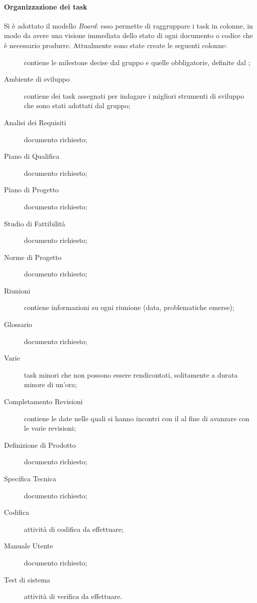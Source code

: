 \paragraph{Organizzazione dei task} Si è adottato il modello \emph{Board}: esso permette di raggruppare i task in colonne, in modo da avere una visione immediata dello stato di ogni documento o codice che è necessario produrre.
Attualmente sono state create le seguenti colonne:
\begin{description}
	\item[] contiene le milestone decise dal gruppo e quelle obbligatorie, definite dal \TV;
	\item[Ambiente di sviluppo] contiene dei task assegnati per indagare i migliori strumenti di sviluppo che sono stati adottati dal gruppo;
	\item[Analisi dei Requisiti] documento richiesto;
	\item[Piano di Qualifica] documento richiesto;
	\item[Piano di Progetto] documento richiesto;
	\item[Studio di Fattibilità] documento richiesto;
	\item[Norme di Progetto] documento richiesto;
	\item[Riunioni] contiene informazioni su ogni riunione (data, problematiche emerse);
	\item[Glossario] documento richiesto;
	\item[Varie] task minori che non possono essere rendicontati, solitamente a durata minore di un'ora;
	\item[Completamento Revisioni] contiene le date nelle quali si hanno incontri con il \TV al fine di avanzare con le varie revisioni; 
	\item[Definizione di Prodotto] documento richiesto;
	\item[Specifica Tecnica] documento richiesto;
	\item[Codifica] attività di codifica da effettuare;
	\item[Manuale Utente] documento richiesto;
	\item[Test di sistema] attività di verifica da effettuare.
\end{description}

